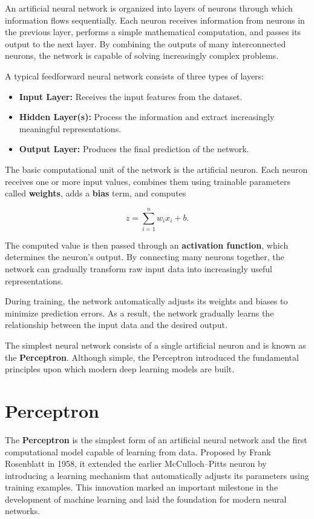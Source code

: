 An artificial neural network is organized into layers of neurons through which information flows sequentially. Each neuron receives information from neurons in the previous layer, performs a simple mathematical computation, and passes its output to the next layer. By combining the outputs of many interconnected neurons, the network is capable of solving increasingly complex problems.

A typical feedforward neural network consists of three types of layers:

\begin{itemize}
    \item \textbf{Input Layer:} Receives the input features from the dataset.
    \item \textbf{Hidden Layer(s):} Process the information and extract increasingly meaningful representations.
    \item \textbf{Output Layer:} Produces the final prediction of the network.
\end{itemize}

The basic computational unit of the network is the artificial neuron. Each neuron receives one or more input values, combines them using trainable parameters called \textbf{weights}, adds a \textbf{bias} term, and computes

\begin{equation}
z=\sum_{i=1}^{n}w_i x_i+b.
\end{equation}

The computed value is then passed through an \textbf{activation function}, which determines the neuron's output. By connecting many neurons together, the network can gradually transform raw input data into increasingly useful representations.

During training, the network automatically adjusts its weights and biases to minimize prediction errors. As a result, the network gradually learns the relationship between the input data and the desired output.

The simplest neural network consists of a single artificial neuron and is known as the \textbf{Perceptron}. Although simple, the Perceptron introduced the fundamental principles upon which modern deep learning models are built.
\section{Perceptron}

The \textbf{Perceptron} is the simplest form of an artificial neural network and the first computational model capable of learning from data. Proposed by Frank Rosenblatt in 1958, it extended the earlier McCulloch--Pitts neuron by introducing a learning mechanism that automatically adjusts its parameters using training examples. This innovation marked an important milestone in the development of machine learning and laid the foundation for modern neural networks.

